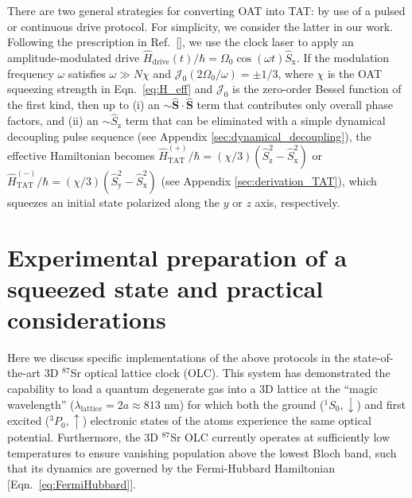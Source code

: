 \documentclass[aps,prx,superscriptaddress,twocolumn]{revtex4-2}
\renewcommand{\t}{\text} %
\newcommand{\p}[1]{\left(#1\right)} %
\renewcommand{\c}{\cdot} %
\renewcommand{\v}{\bm} %
\newcommand{\J}{\mathcal{J}}
\newcommand{\z}{\text{z}}
\newcommand{\x}{\text{x}}
\newcommand{\y}{\text{y}}
\newcommand{\up}{\uparrow}
\newcommand{\dn}{\downarrow}
\begin{document}
There are two general strategies for converting OAT into TAT: by use of a pulsed\cite{liu2011spin} or continuous\cite{huang2015twoaxis} drive protocol.
For simplicity, we consider the latter in our work.
Following the prescription in Ref.~[], we use the clock laser to apply an amplitude-modulated drive $\hat H_{\t{drive}}(t)/\hbar=\Omega_0\cos(\omega t)\hat{S}_\x$.
If the modulation frequency $\omega$ satisfies $\omega\gg N\chi$ and $\J_0\p{2\Omega_0/\omega}=\pm1/3$, where $\chi$ is the OAT squeezing strength in Eqn.~\eqref{eq:H_eff} and $\J_0$ is the zero-order Bessel function of the first kind, then up to (i) an $\sim\hat{\v S}\c\hat{\v S}$ term that contributes only overall phase factors, and (ii) an $\sim\hat S_\z$ term that can be eliminated with a simple dynamical decoupling pulse sequence (see Appendix \ref{sec:dynamical_decoupling}), the effective Hamiltonian becomes $\hat H_{\t{TAT}}^{(+)}/\hbar = (\chi/3)(\hat S_\z^2-\hat S_\x^2)$ or $\hat H_{\t{TAT}}^{(-)}/\hbar = (\chi/3)(\hat S_\y^2-\hat S_\x^2)$ (see Appendix \ref{sec:derivation_TAT}), which squeezes an initial state polarized along the $y$ or $z$ axis, respectively.


\section{Experimental preparation of a squeezed state and practical considerations}

Here we discuss specific implementations of the above protocols in the state-of-the-art 3D $^{87}$Sr optical lattice clock (OLC).
This system has demonstrated the capability to load a quantum degenerate gas into a 3D lattice at the ``magic wavelength'' ($\lambda_{\t{lattice}}=2a\approx813$ nm) for which both the ground ($^1S_0,\dn$) and first excited ($^3P_0,\up$) electronic states of the atoms experience the same optical potential\cite{campbell2017fermidegenerate}.
Furthermore, the 3D $^{87}$Sr OLC currently operates at sufficiently low temperatures to ensure vanishing population above the lowest Bloch band, such that its dynamics are governed by the Fermi-Hubbard Hamiltonian [Eqn.~\eqref{eq:FermiHubbard}]\cite{esslinger2010fermihubbard}.
\end{document}
